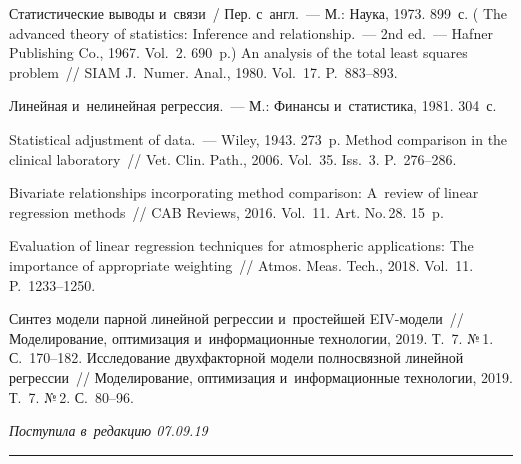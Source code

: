 \begin{multicols}{2}
{{\begin{thebibliography}{99}
 Статистические выводы и~связи~/
Пер. с~англ.~--- М.: Наука, 1973. 
899~с. ( The
advanced theory of statistics: Inference and relationship.~---
2nd ed.~--- Hafner Publishing Co., 1967. Vol.~2. 690~p.)
 An analysis of the total least squares problem~// SIAM 
J.~Numer. Anal., 1980. Vol.~17. P.~883--893.

 Линейная и~нелинейная регрессия.~--- М.: Финансы и~статистика, 
1981. 304~с.

 Statistical adjustment of data.~--- Wiley, 1943. 273~p.
 Method comparison in the clinical laboratory~// 
Vet. Clin. Path., 2006. Vol.~35. Iss.~3. P.~276--286.

 Bivariate 
relationships incorporating method comparison: A~review of linear regression methods~// CAB 
Reviews, 2016. Vol.~11. Art. No.\,28. 15~p.

 Evaluation of linear regression techniques for atmospheric applications: 
The importance of appropriate weighting~// Atmos. Meas. Tech., 2018. 
Vol.~11. P.~1233--1250.

 Синтез модели парной линейной регрессии и~простейшей 
EIV-мо\-де\-ли~// Моделирование, оптимизация и~информационные технологии, 2019. 
Т.~7. №\,1. С.~170--182.
 Исследование двухфакторной модели полносвязной линейной 
регрессии~// Моделирование, оптимизация и~информационные технологии, 2019. Т.~7. 
№\,2. С.~80--96.
\end{thebibliography}

 }
 }

\end{multicols}

\vspace*{-6pt}

\hfill{\small\textit{Поступила в~редакцию 07.09.19}}

\vspace*{8pt}




\hrule

